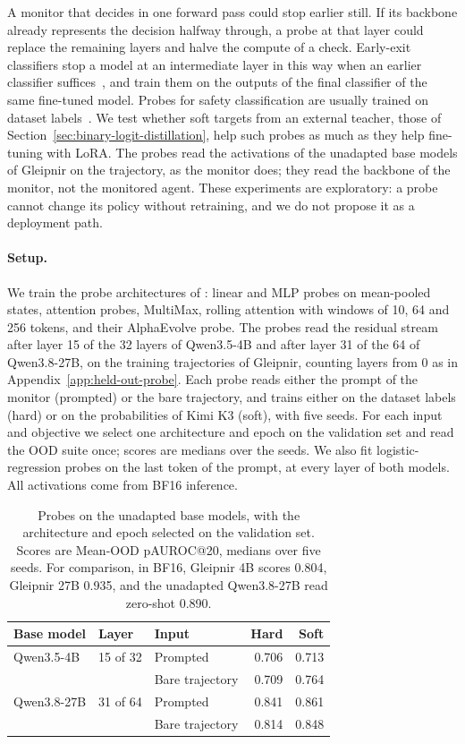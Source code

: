 A monitor that decides in one forward pass could stop earlier still.
If its backbone already represents the decision halfway through, a probe at that layer could replace the remaining layers and halve the compute of a check.
Early-exit classifiers stop a model at an intermediate layer in this way when an earlier classifier suffices~\citep{xin2020deebert}, and \citet{liu2020fastbert} train them on the outputs of the final classifier of the same fine-tuned model.
Probes for safety classification are usually trained on dataset labels~\citep{kramar2026building}.
We test whether soft targets from an external teacher, those of Section~\ref{sec:binary-logit-distillation}, help such probes as much as they help fine-tuning with LoRA.
The probes read the activations of the unadapted base models of Gleipnir on the trajectory, as the monitor does; they read the backbone of the monitor, not the monitored agent.
These experiments are exploratory: a probe cannot change its policy without retraining, and we do not propose it as a deployment path.

\paragraph{Setup.}
We train the probe architectures of \citet{kramar2026building}: linear and MLP probes on mean-pooled states, attention probes, MultiMax, rolling attention with windows of 10, 64 and 256 tokens, and their AlphaEvolve probe.
The probes read the residual stream after layer 15 of the 32 layers of Qwen3.5-4B and after layer 31 of the 64 of Qwen3.8-27B, on the training trajectories of Gleipnir, counting layers from 0 as in Appendix~\ref{app:held-out-probe}.
Each probe reads either the prompt of the monitor (prompted) or the bare trajectory, and trains either on the dataset labels (hard) or on the probabilities of Kimi K3 (soft), with five seeds.
For each input and objective we select one architecture and epoch on the validation set and read the OOD suite once; scores are medians over the seeds.
We also fit logistic-regression probes on the last token of the prompt, at every layer of both models.
All activations come from BF16 inference.

\begin{table}[h]
\caption{Probes on the unadapted base models, with the architecture and epoch selected on the validation set. Scores are Mean-OOD pAUROC@20, medians over five seeds. For comparison, in BF16, Gleipnir 4B scores 0.804, Gleipnir 27B 0.935, and the unadapted Qwen3.8-27B read zero-shot 0.890.}
\label{tab:probes}
\centering
\small
\begin{tabular}{@{}lllrr@{}}
\toprule
Base model & Layer & Input & Hard & Soft \\
\midrule
Qwen3.5-4B & 15 of 32 & Prompted & 0.706 & 0.713 \\
 & & Bare trajectory & 0.709 & 0.764 \\
\midrule
Qwen3.8-27B & 31 of 64 & Prompted & 0.841 & 0.861 \\
 & & Bare trajectory & 0.814 & 0.848 \\
\bottomrule
\end{tabular}
\end{table}


